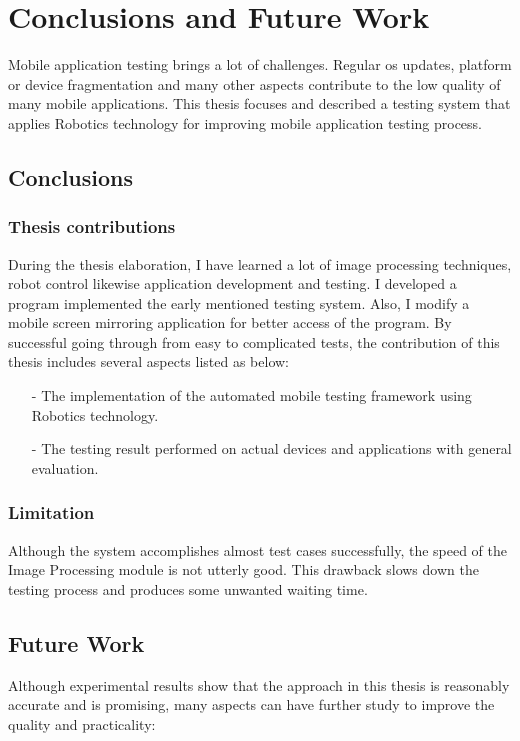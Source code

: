 \chapter{Conclusions and Future Work}
Mobile application testing brings a lot of challenges. Regular \acrshort{os} updates, platform or device fragmentation and many other aspects contribute to the low quality of many mobile applications. This thesis focuses and described a testing system that applies Robotics technology for improving mobile application testing process.

\section{Conclusions}
\subsection{Thesis contributions}
During the thesis elaboration, I have learned a lot of image processing techniques, robot control likewise application development and testing.
I developed a program implemented the early mentioned testing system. Also, I modify a mobile screen mirroring application for better access of the program.
\newline
By successful going through from easy to complicated tests, the contribution of this thesis includes several aspects listed as below:
	
    \begin{itemize}
		\item[-] The implementation of the automated mobile testing framework using Robotics technology.
		\item[-] The testing result performed on actual devices and applications with general evaluation.
	\end{itemize}

\subsection{Limitation}
Although the system accomplishes almost test cases successfully, the speed of the Image Processing module is not utterly good. This drawback slows down the testing process and produces some unwanted waiting time.

\section{Future Work}
Although experimental results show that the approach in this thesis is reasonably accurate and is promising, many aspects can have further study to improve the quality and practicality:

